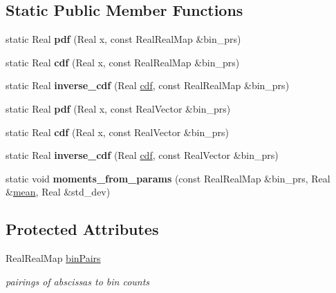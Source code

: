\subsection*{Static Public Member Functions}
\begin{DoxyCompactItemize}
\item 
static Real {\bfseries pdf} (Real x, const Real\+Real\+Map \&bin\+\_\+prs)\label{classPecos_1_1HistogramBinRandomVariable_aa78e445e8071ed1e8da12de52cdbefb3}

\item 
static Real {\bfseries cdf} (Real x, const Real\+Real\+Map \&bin\+\_\+prs)\label{classPecos_1_1HistogramBinRandomVariable_a9f6e7cb49835bf9275856220e2919c30}

\item 
static Real {\bfseries inverse\+\_\+cdf} (Real \hyperlink{classPecos_1_1HistogramBinRandomVariable_addd564e7f4f314e12d38df74d845f0d8}{cdf}, const Real\+Real\+Map \&bin\+\_\+prs)\label{classPecos_1_1HistogramBinRandomVariable_a40a7d7fbd48653bde304ea050fc6ce25}

\item 
static Real {\bfseries pdf} (Real x, const Real\+Vector \&bin\+\_\+prs)\label{classPecos_1_1HistogramBinRandomVariable_ae5f1970871762a513b64975d05b9f851}

\item 
static Real {\bfseries cdf} (Real x, const Real\+Vector \&bin\+\_\+prs)\label{classPecos_1_1HistogramBinRandomVariable_a032c9f2aa0c5b962f0600c23b0928827}

\item 
static Real {\bfseries inverse\+\_\+cdf} (Real \hyperlink{classPecos_1_1HistogramBinRandomVariable_addd564e7f4f314e12d38df74d845f0d8}{cdf}, const Real\+Vector \&bin\+\_\+prs)\label{classPecos_1_1HistogramBinRandomVariable_af22e3710ee3c47c45b430c16efe1e9bc}

\item 
static void {\bfseries moments\+\_\+from\+\_\+params} (const Real\+Real\+Map \&bin\+\_\+prs, Real \&\hyperlink{classPecos_1_1HistogramBinRandomVariable_a962ffe5a3593be370d5c883365c060f4}{mean}, Real \&std\+\_\+dev)\label{classPecos_1_1HistogramBinRandomVariable_af727d65dc707ee958179edcf85b9df5c}

\end{DoxyCompactItemize}
\subsection*{Protected Attributes}
\begin{DoxyCompactItemize}
\item 
Real\+Real\+Map \hyperlink{classPecos_1_1HistogramBinRandomVariable_a3abb5d3b3e536de19f768ff1072e3aa1}{bin\+Pairs}\label{classPecos_1_1HistogramBinRandomVariable_a3abb5d3b3e536de19f768ff1072e3aa1}

\begin{DoxyCompactList}\small\item\em pairings of abscissas to bin counts \end{DoxyCompactList}\end{DoxyCompactItemize}
